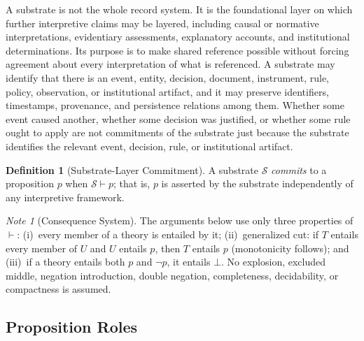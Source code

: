 \documentclass[11pt]{article}
\theoremstyle{plain}
\theoremstyle{definition}
\newtheorem{definition}[theorem]{Definition}
\theoremstyle{remark}
\newtheorem{note}[theorem]{Note}
\newcommand{\Substrate}{\mathcal{S}}
\newcommand{\entails}{\vdash}
\begin{document}
A substrate is not the whole record system.
It is the foundational layer on which further interpretive claims may be layered,
including causal or normative interpretations,
evidentiary assessments, explanatory accounts, and institutional determinations.
Its purpose is to make shared reference possible without
forcing agreement about every interpretation of what is referenced.
A substrate may identify that there is an event, entity, decision,
document, instrument, rule, policy, observation, or institutional artifact, and
it may preserve identifiers, timestamps, provenance, and persistence relations
among them.
Whether some event caused another,
whether some decision was justified, or
whether some rule ought to apply
are not commitments of the substrate
just because the substrate identifies
the relevant event, decision, rule,
or institutional artifact.


\begin{definition}[Substrate-Layer Commitment]
  \label{se100.def.SubstrateCommitment}
  A substrate $\Substrate$ \emph{commits} to a proposition $p$ when
  $\Substrate \entails p$;
  that is, $p$ is asserted by the substrate independently of any interpretive
  framework.
\end{definition}

\begin{note}[Consequence System]
  \label{se100.note.ConsequenceSystem}
  The arguments below use only three properties of $\entails$:
  (i)~every member of a theory is entailed by it;
  (ii)~generalized cut: if $T$ entails every member of $U$ and $U$
  entails $p$, then $T$ entails $p$ (monotonicity follows); and
  (iii)~if a theory entails both $p$ and $\neg p$, it entails $\bot$.
  No explosion, excluded middle, negation introduction, double negation,
  completeness, decidability, or compactness is assumed.
\end{note}

\subsection*{Proposition Roles}
\end{document}
